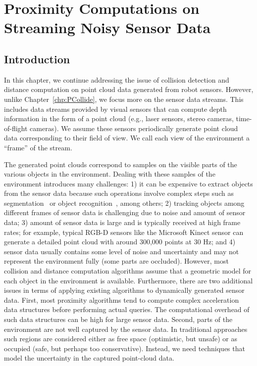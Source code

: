 \chapter{Proximity Computations on Streaming Noisy Sensor Data}
\label{chp:PCollide2}


\section{Introduction}

In this chapter, we continue addressing
the issue of collision detection and distance computation on point cloud data generated from robot sensors. However, unlike Chapter~\ref{chp:PCollide}, we focus more on the sensor data streams.
This includes data streams provided by visual sensors that can compute depth information in the form of a point cloud (e.g., laser sensors, stereo
cameras, time-of-flight cameras). We assume these
sensors periodically generate point cloud data corresponding to their
field of view. We call each view of the environment a ``frame'' of the stream.

The generated point clouds correspond to samples on the visible parts
of the various objects in the environment. Dealing with these samples
of the environment introduces many challenges: 1) it can be expensive
to extract objects from the sensor data because such operations involve
complex steps such as segmentation~\cite{Rusu:2009:IROS} or object
recognition~\cite{Muja:2011:ICRA}, among others; 2) tracking objects
among different frames of sensor data is challenging due to noise and
amount of sensor data; 3) amount of sensor data is large and is typically
received at high frame rates; for example, typical RGB-D sensors like
the Microsoft Kinect\texttrademark{}  sensor can generate a detailed point
cloud with around 300,000 points at 30 Hz; and 4) sensor data usually
contains some level of noise and uncertainty and may not represent
the environment fully (some parts are occluded). However, most
collision and distance computation algorithms assume that a geometric
model for each object in the environment is available. Furthermore,
there are two additional issues in terms of applying existing
algorithms to dynamically generated sensor data. First, most proximity
algorithms tend to compute complex acceleration data structures before
performing actual queries. The computational overhead of such data structures can be high for large sensor data. Second, parts of the environment are not well captured by the sensor data. In
traditional approaches such regions are considered either as
free space (optimistic, but unsafe) or as occupied (safe, but perhaps
too conservative). Instead, we need techniques that model the uncertainty in the captured point-cloud data.

